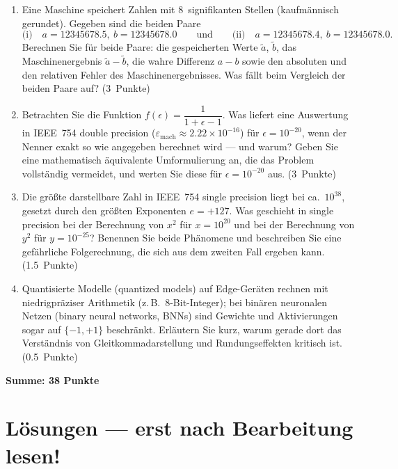\documentclass[a4paper,11pt]{scrartcl}
\begin{document}
\begin{enumerate}[label=(\alph*)]
  \item Eine Maschine speichert Zahlen mit 8~signifikanten Stellen (kaufmännisch gerundet). Gegeben sind die beiden Paare
  \[
  \text{(i)}\quad a = 12345678.5,\ b = 12345678.0
  \qquad\text{und}\qquad
  \text{(ii)}\quad a = 12345678.4,\ b = 12345678.0.
  \]
  Berechnen Sie für beide Paare: die gespeicherten Werte $\tilde{a}$, $\tilde{b}$, das Maschinenergebnis $\tilde{a} - \tilde{b}$, die wahre Differenz $a - b$ sowie den absoluten und den relativen Fehler des Maschinenergebnisses. Was fällt beim Vergleich der beiden Paare auf? \hfill (3~Punkte)
  \item Betrachten Sie die Funktion $f(\epsilon) = \dfrac{1}{1 + \epsilon - 1}$. Was liefert eine Auswertung in IEEE~754 double precision ($\varepsilon_{\text{mach}} \approx 2.22 \times 10^{-16}$) für $\epsilon = 10^{-20}$, wenn der Nenner exakt so wie angegeben berechnet wird --- und warum? Geben Sie eine mathematisch äquivalente Umformulierung an, die das Problem vollständig vermeidet, und werten Sie diese für $\epsilon = 10^{-20}$ aus. \hfill (3~Punkte)
  \item Die größte darstellbare Zahl in IEEE~754 single precision liegt bei ca.\ $10^{38}$, gesetzt durch den größten Exponenten $e = +127$. Was geschieht in single precision bei der Berechnung von $x^2$ für $x = 10^{20}$ und bei der Berechnung von $y^2$ für $y = 10^{-25}$? Benennen Sie beide Phänomene und beschreiben Sie eine gefährliche Folgerechnung, die sich aus dem zweiten Fall ergeben kann. \hfill (1.5~Punkte)
  \item Quantisierte Modelle (quantized models) auf Edge-Geräten rechnen mit niedrigpräziser Arithmetik (z.\,B.\ 8-Bit-Integer); bei binären neuronalen Netzen (binary neural networks, BNNs) sind Gewichte und Aktivierungen sogar auf $\{-1, +1\}$ beschränkt. Erläutern Sie kurz, warum gerade dort das Verständnis von Gleitkommadarstellung und Rundungseffekten kritisch ist. \hfill (0.5~Punkte)
\end{enumerate}

\bigskip
\noindent\textbf{Summe: 38 Punkte}

\schreibraum[11]
\newpage
\section*{Lösungen --- erst nach Bearbeitung lesen!}\label{sec:loesungen}
\end{document}
